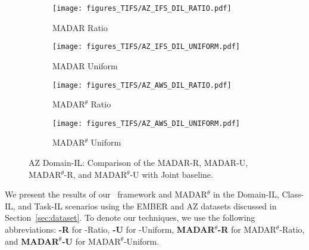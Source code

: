 \begin{figure}[!t]
    \centering
    \begin{subfigure}{0.485\linewidth}
        \centering
        \texttt{[image: figures\_TIFS/AZ\_IFS\_DIL\_RATIO.pdf]}
        \label{fig:AZ_DIL_IFS_R}
        \vspace{-0.4cm}
        \caption{MADAR Ratio}
    \end{subfigure}
    \hfill
    \begin{subfigure}{0.485\linewidth}
        \centering
        \texttt{[image: figures\_TIFS/AZ\_IFS\_DIL\_UNIFORM.pdf]}
        \label{fig:AZ_DIL_IFS_U}
        \vspace{-0.4cm}
        \caption{MADAR Uniform}
    \end{subfigure}
    \hfill
    \begin{subfigure}{0.485\linewidth}
        \centering
        \texttt{[image: figures\_TIFS/AZ\_AWS\_DIL\_RATIO.pdf]}
        \label{fig:AZ_DIL_AWS_R}
        \vspace{-0.4cm}
        \caption{MADAR$^\theta$ Ratio}
    \end{subfigure}
    \hfill
    \begin{subfigure}{0.485\linewidth}
        \centering
        \texttt{[image: figures\_TIFS/AZ\_AWS\_DIL\_UNIFORM.pdf]}
        \label{fig:AZ_DIL_AWS_U}
        \vspace{-0.4cm}
        \caption{MADAR$^\theta$ Uniform}
    \end{subfigure}

    \caption{AZ Domain-IL: Comparison of the MADAR-R, MADAR-U, MADAR$^\theta$-R, and MADAR$^\theta$-U with Joint baseline.}
    \label{fig:az_DIL}
    \vspace{-0.3cm}
\end{figure}








We present the results of our \system\ framework and MADAR$^\theta$ in the Domain-IL, Class-IL, and Task-IL scenarios using the EMBER and AZ datasets discussed in Section~\ref{sec:dataset}. To denote our techniques, we use the following abbreviations: {\bf \system-R} for \system-Ratio, {\bf \system-U} for \system-Uniform, {\bf MADAR$^\theta$-R} for MADAR$^\theta$-Ratio, and {\bf MADAR$^\theta$-U} for MADAR$^\theta$-Uniform.

